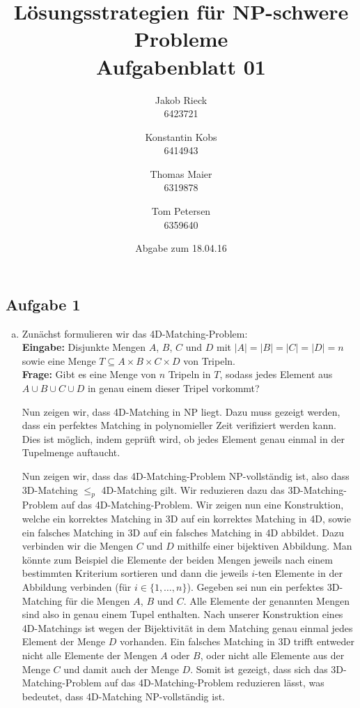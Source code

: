 \documentclass[12pt,a4paper]{article}
\title{Lösungsstrategien für NP-schwere Probleme\\Aufgabenblatt 01}
\author{
		Jakob Rieck\\
		\small{6423721}
	\and
		Konstantin Kobs\\
		\small{6414943}
	\and
		Thomas Maier\\
		\small{6319878}
	\and
		Tom Petersen\\
		\small{6359640}
}
\date{Abgabe zum 18.04.16}
\begin{document}
\maketitle

\subsection*{Aufgabe 1}

\begin{enumerate}[a)]

	\item Zunächst formulieren wir das 4D-Matching-Problem:\\
	\textbf{Eingabe:} Disjunkte Mengen $A$, $B$, $C$ und $D$ mit $|A| = |B| = |C| = |D| = n$ sowie eine Menge $T \subseteq A \times B \times C \times D$ von Tripeln.\\
	\textbf{Frage:} Gibt es eine Menge von $n$ Tripeln in $T$, sodass jedes Element aus $A \cup B \cup C \cup D$ in genau einem dieser Tripel vorkommt?
	
	Nun zeigen wir, dass 4D-Matching in NP liegt. Dazu muss gezeigt werden, dass ein perfektes Matching in polynomieller Zeit verifiziert werden kann. Dies ist möglich, indem geprüft wird, ob jedes Element genau einmal in der Tupelmenge auftaucht.
	
	Nun zeigen wir, dass das 4D-Matching-Problem NP-vollständig ist, also dass 3D-Matching $\leq_p$ 4D-Matching gilt. Wir reduzieren dazu das 3D-Matching-Problem auf das 4D-Matching-Problem. Wir zeigen nun eine Konstruktion, welche ein korrektes Matching in 3D auf ein korrektes Matching in 4D, sowie ein falsches Matching in 3D auf ein falsches Matching in 4D abbildet. Dazu verbinden wir die Mengen $C$ und $D$ mithilfe einer bijektiven Abbildung. Man könnte zum Beispiel die Elemente der beiden Mengen jeweils nach einem bestimmten Kriterium sortieren und dann die jeweils $i$-ten Elemente in der Abbildung verbinden (für $i \in \{1,\dots,n\}$). Gegeben sei nun ein perfektes 3D-Matching für die Mengen $A$, $B$ und $C$. Alle Elemente der genannten Mengen sind also in genau einem Tupel enthalten. Nach unserer Konstruktion eines 4D-Matchings ist wegen der Bijektivität in dem Matching genau einmal jedes Element der Menge $D$ vorhanden. Ein falsches Matching in 3D trifft entweder nicht alle Elemente der Mengen $A$ oder $B$, oder nicht alle Elemente aus der Menge $C$ und damit auch der Menge $D$. Somit ist gezeigt, dass sich das 3D-Matching-Problem auf das 4D-Matching-Problem reduzieren lässt, was bedeutet, dass 4D-Matching NP-vollständig ist.



\end{enumerate}
\end{document}
